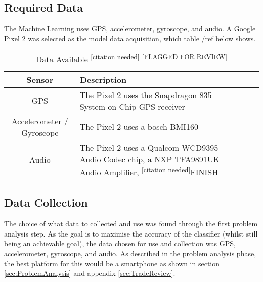 \documentclass{UoNMCHA}
\newcommand{\citationneeded}{\textsuperscript{\color{blue} [citation needed]}}
\newcommand{\flagforreview}{\textsuperscript{\color{red} [FLAGGED FOR REVIEW]}}
\numberwithin{equation}{section}
\begin{document}
\subsection{Required Data}
The Machine Learning uses GPS, accelerometer, gyroscope, and audio. A Google Pixel 2 was selected as the model data acquisition, which table /ref{} below shows.
\begin{table}[h!] 
    \begin{center}
        \caption{Data Available\citationneeded \flagforreview}\label{tab:AndroidDataAvailable}
        {\footnotesize
            \begin{tabular}{clll}
                \hline\hline Sensor & Description \\ \hline 
                GPS & The Pixel 2 uses the Snapdragon 835 System on Chip GPS receiver\\
                Accelerometer / Gyroscope & The Pixel 2 uses a bosch BMI160 \\
                Audio & The Pixel 2 uses a Qualcom WCD9395 Audio Codec chip, a NXP TFA9891UK Audio Amplifier, \citationneeded FINISH \\ \hline
            \end{tabular}
        }
    \end{center}
\end{table}

\subsection{Data Collection}

The choice of what data to collected and use was found through the first problem analysis step. As the goal is to maximise the accuracy of the classifier (whilst still being an achievable goal), the data chosen for use and collection was GPS, accelerometer, gyroscope, and audio. As described in the problem analysis phase, the best platform for this would be a smartphone as shown in section \ref{sec:ProblemAnalysis} and appendix \ref{sec:TradeReview}. 

\end{document}
